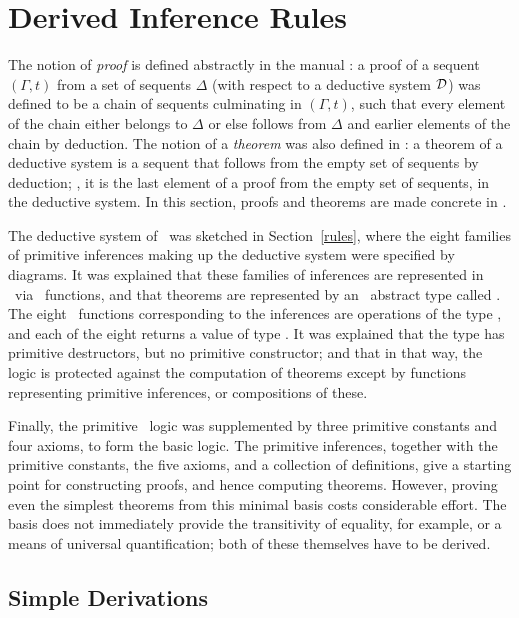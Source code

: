 \chapter{Derived Inference Rules}
\label{derived-rules}

The notion of {\it proof\/} is defined abstractly in the manual
\LOGIC: a proof of a sequent $(\Gamma,t)$ from a set of sequents
$\Delta$ (with respect to a deductive system ${\cal D}$) was defined
to be a chain of sequents culminating in $(\Gamma,t)$, such that every
element of the chain either belongs to $\Delta$ or else follows from
$\Delta$ and earlier elements of the chain by deduction.  The notion
of a {\it theorem\/} was also defined in \LOGIC: a theorem of a
deductive system is a sequent that follows from the empty set of
sequents by deduction; \ie, it is the last element of a proof from the
empty set of sequents, in the deductive system.  In this section,
proofs and theorems are made concrete in \HOL.

The deductive system of \HOL\
was sketched in Section~\ref{rules}, where
the eight families of primitive inferences making up the
deductive system were specified by diagrams. It was explained that
these families of inferences are represented in \HOL\ via
\ML\ functions, and that theorems
are represented by an \ML\ abstract type called .
The eight \ML\ functions corresponding to the inferences
are operations of the type , and each of the eight
returns a value of type . It was explained that the
type \ml{thm} has primitive destructors, but no primitive
constructor; and that in that way, the logic is protected against
the computation of theorems except by functions representing
primitive inferences, or compositions of these.

Finally, the primitive \HOL\ logic was supplemented by three primitive
constants and four axioms, to form the basic logic.  The primitive
inferences, together with the primitive constants, the five axioms,
and a collection of definitions, give a starting point for
constructing proofs, and hence computing theorems. However, proving
even the simplest theorems from this minimal basis costs considerable
effort. The basis does not immediately provide the transitivity of
equality, for example, or a means of universal quantification; both of
these themselves have to be derived.

\section{Simple Derivations}

